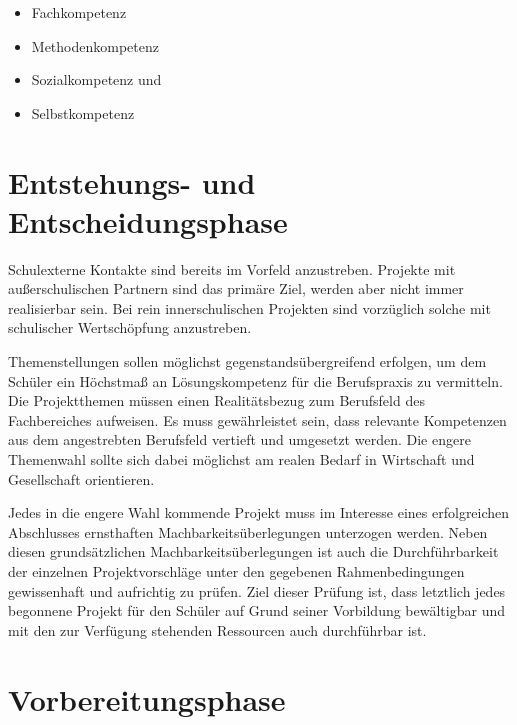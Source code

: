 \begin{itemize}
	\item Fachkompetenz
	\item Methodenkompetenz
	\item Sozialkompetenz und
	\item Selbstkompetenz
\end{itemize}



\section{Entstehungs- und Entscheidungsphase}

Schulexterne Kontakte sind bereits im Vorfeld anzustreben. Projekte mit außerschulischen Partnern sind das primäre Ziel, werden aber nicht immer realisierbar sein. Bei rein innerschulischen Projekten sind vorzüglich solche mit schulischer Wertschöpfung anzustreben.

Themenstellungen sollen möglichst gegenstandsübergreifend erfolgen, um dem Schüler ein Höchstmaß an Lösungskompetenz für die Berufspraxis zu vermitteln. Die Projektthemen müssen einen Realitätsbezug zum Berufsfeld des Fachbereiches aufweisen. Es muss gewährleistet sein, dass relevante Kompetenzen aus dem angestrebten Berufsfeld vertieft und umgesetzt werden. Die engere Themenwahl sollte sich dabei möglichst am realen Bedarf in Wirtschaft und Gesellschaft orientieren.

Jedes in die engere Wahl kommende Projekt muss im Interesse eines erfolgreichen Abschlusses ernsthaften Machbarkeitsüberlegungen unterzogen werden. Neben diesen grundsätzlichen Machbarkeitsüberlegungen ist auch die Durchführbarkeit der einzelnen Projektvorschläge unter den gegebenen Rahmenbedingungen gewissenhaft und aufrichtig zu prüfen. Ziel dieser Prüfung ist, dass letztlich jedes begonnene Projekt für den Schüler auf Grund seiner Vorbildung bewältigbar und mit den zur Verfügung stehenden Ressourcen auch durchführbar ist.


\section{Vorbereitungsphase}

